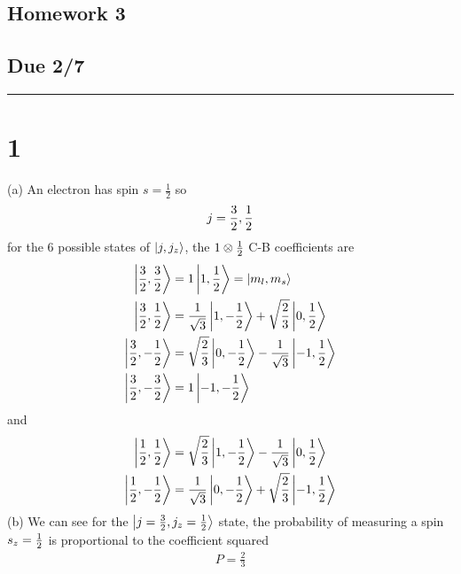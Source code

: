 \documentclass[../main.tex]{subfiles}
\begin{document}
\setcounter{section}{1}
\begin{center}
    \section*{Homework 3}
    \subsection*{Due 2/7}
\end{center}
\hrule \vspace{10px}

\section*{1} 
(a) An electron has spin $s = \frac{1}{2}$ so
\begin{align*}
    j = \frac{3}{2}, \frac{1}{2}
\end{align*}
for the 6 possible states of $\ket {j, j_z}$, the $1 \otimes \frac{1}{2}$ C-B coefficients are
\begin{align*}
    \ket{\frac{3}{2}, \frac{3}{2}} &=  1 \ket {1,\frac{1}{2}} = \ket{m_l, m_s} \\
    \ket{\frac{3}{2}, \frac{1}{2}} &= \frac{1}{\sqrt{3}} \ket {1,-\frac{1}{2}} + \sqrt{\frac{2}{3}} \ket {0,\frac{1}{2}} \\
    \ket{\frac{3}{2}, -\frac{1}{2}} &= \sqrt{\frac{2}{3}} \ket {0,-\frac{1}{2}} - \frac{1}{\sqrt{3}} \ket {-1,\frac{1}{2}} \\
    \ket{\frac{3}{2}, -\frac{3}{2}} &= 1 \ket {-1,-\frac{1}{2}}
\end{align*}
and
\begin{align*}
    \ket{\frac{1}{2}, \frac{1}{2}} &= \sqrt{\frac{2}{3}} \ket {1,-\frac{1}{2}} - \frac{1}{\sqrt{3}} \ket {0,\frac{1}{2}} \\
    \ket{\frac{1}{2}, -\frac{1}{2}} &= \frac{1}{\sqrt{3}} \ket {0,-\frac{1}{2}} + \sqrt{\frac{2}{3}} \ket {-1,\frac{1}{2}}
\end{align*}
(b) We can see for the $\ket{j=\frac{3}{2}, j_z = \frac{1}{2}}$ state, the probability of measuring a spin
$s_z = \frac{1}{2}$ is proportional to the coefficient squared
\begin{align*}
    P = \frac{2}{3}
\end{align*}
\end{document}
